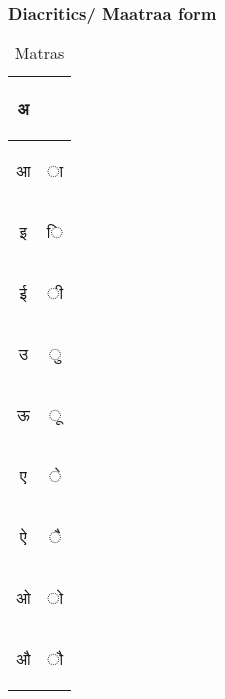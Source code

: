 \documentclass[12pt]{scrartcl}
\begin{document}
\subsubsection{Diacritics/ Maatraa form}
\begin{table}[H]
    \centering
    \begin{tabular}{c|c}
\begin{hindi} अ \end{hindi}   &  \\ \hline
\begin{hindi} आ \end{hindi}   & \begin{hindi} ा \end{hindi} \\ \hline
\begin{hindi} इ \end{hindi}   & \begin{hindi}  ि \end{hindi} \\ \hline
\begin{hindi} ई \end{hindi}   & \begin{hindi} ी \end{hindi} \\ \hline
\begin{hindi} उ \end{hindi}   & \begin{hindi} ु\end{hindi} \\ \hline
\begin{hindi} ऊ \end{hindi}   & \begin{hindi} ू \end{hindi} \\ \hline
\begin{hindi} ए \end{hindi}   & \begin{hindi} े\end{hindi} \\ \hline
\begin{hindi} ऐ \end{hindi}   & \begin{hindi} ै \end{hindi} \\ \hline
\begin{hindi} ओ \end{hindi}   & \begin{hindi} ो  \end{hindi} \\ \hline
\begin{hindi} औ \end{hindi}   & \begin{hindi} ौ \end{hindi} \\


    \end{tabular}
    \caption{Matras}
    \label{tab:my_label}
\end{table}
\end{document}
